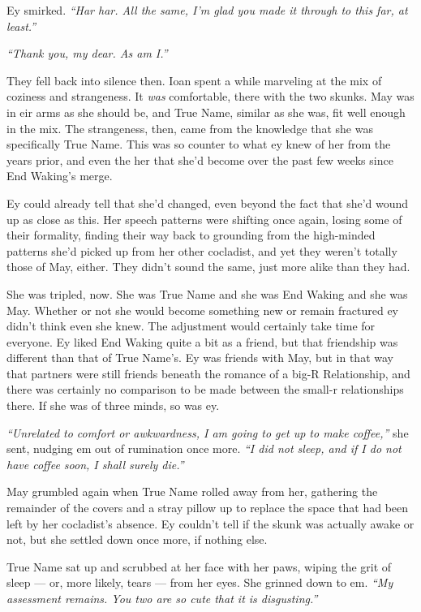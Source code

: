 Ey smirked. \emph{``Har har. All the same, I'm glad you made it through to this far, at least.''}

\emph{``Thank you, my dear. As am I.''}

They fell back into silence then. Ioan spent a while marveling at the mix of coziness and strangeness. It \emph{was} comfortable, there with the two skunks. May was in eir arms as she should be, and True Name, similar as she was, fit well enough in the mix. The strangeness, then, came from the knowledge that she was specifically True Name. This was so counter to what ey knew of her from the years prior, and even the her that she'd become over the past few weeks since End Waking's merge.

Ey could already tell that she'd changed, even beyond the fact that she'd wound up as close as this. Her speech patterns were shifting once again, losing some of their formality, finding their way back to grounding from the high-minded patterns she'd picked up from her other cocladist, and yet they weren't totally those of May, either. They didn't sound the same, just more alike than they had.

She was tripled, now. She was True Name and she was End Waking and she was May. Whether or not she would become something new or remain fractured ey didn't think even she knew. The adjustment would certainly take time for everyone. Ey liked End Waking quite a bit as a friend, but that friendship was different than that of True Name's. Ey was friends with May, but in that way that partners were still friends beneath the romance of a big-R Relationship, and there was certainly no comparison to be made between the small-r relationships there. If she was of three minds, so was ey.

\emph{``Unrelated to comfort or awkwardness, I am going to get up to make coffee,''} she sent, nudging em out of rumination once more. \emph{``I did not sleep, and if I do not have coffee soon, I shall surely die.''}

May grumbled again when True Name rolled away from her, gathering the remainder of the covers and a stray pillow up to replace the space that had been left by her cocladist's absence. Ey couldn't tell if the skunk was actually awake or not, but she settled down once more, if nothing else.

True Name sat up and scrubbed at her face with her paws, wiping the grit of sleep — or, more likely, tears — from her eyes. She grinned down to em. \emph{``My assessment remains. You two are so cute that it is disgusting.''}

